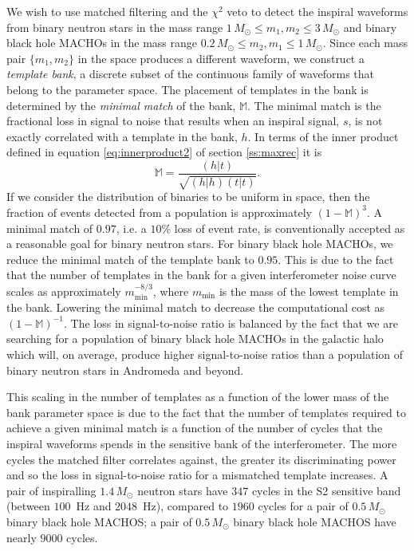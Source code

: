 We wish to use matched filtering and the $\chi^2$ veto to detect the inspiral
waveforms from binary neutron stars in the mass range $1\,M_\odot\le m_1,
m_2\le 3\,M_\odot$ and binary black hole MACHOs in the mass range
$0.2\,M_\odot\le m_2, m_1\le 1\,M_\odot$. Since each mass pair $\{m_1,m_2\}$
in the space produces a different waveform, we construct a {\em template
bank}, a discrete subset of the continuous family of waveforms that belong to
the parameter space. The placement of templates in the bank is determined by
the \emph{minimal match} of the bank, $\mathbb{M}$. The minimal match is the
fractional loss in signal to noise that results when an inspiral signal, $s$,
is not exactly correlated with a template in the bank, $h$. In terms of the
inner product defined in equation \ref{eq:innerproduct2} of section
\ref{ss:maxrec} it is
\begin{equation}
\mathbb{M} = \frac{(h|t)} {\sqrt{(h|h)(t|t)}}.
\end{equation}
If we consider the distribution of binaries to be uniform in space, then the
fraction of events detected from a population is approximately
$(1-\mathbb{M})^3$. A minimal match of $0.97$, i.e. a $10\%$ loss of event
rate, is conventionally accepted as a reasonable goal for binary neutron
stars. For binary black hole MACHOs, we reduce the minimal match of the
template bank to $0.95$. This is due to the fact that the number of templates
in the bank for a given interferometer noise curve scales as approximately
$m_\mathrm{min}^{-8/3}$, where $m_\mathrm{min}$ is the mass of the lowest
template in the bank. Lowering the minimal match to decrease the computational
cost as $(1 - \mathbb{M})^{-1}$. The loss in signal-to-noise ratio is balanced
by the fact that we are searching for a population of binary black hole MACHOs
in the galactic halo which will, on average, produce higher signal-to-noise
ratios than a population of binary neutron stars in Andromeda and beyond.

This scaling in the number of templates as a function of the lower mass of the
bank parameter space is due to the fact that the number of templates required
to achieve a given minimal match is a function of the number of cycles that the
inspiral waveforms spends in the sensitive bank of the interferometer. The
more cycles the matched filter correlates against, the greater its
discriminating power and so the loss in signal-to-noise ratio for a mismatched
template increases. A pair of inspiralling $1.4\,M_\odot$ neutron stars have
$347$ cycles in the S2 sensitive band (between $100$~Hz and $2048$~Hz),
compared to $1960$ cycles for a pair of $0.5\,M_\odot$ binary black hole
MACHOS; a pair of $0.5\,M_\odot$ binary black hole MACHOS have nearly $9000$
cycles.

